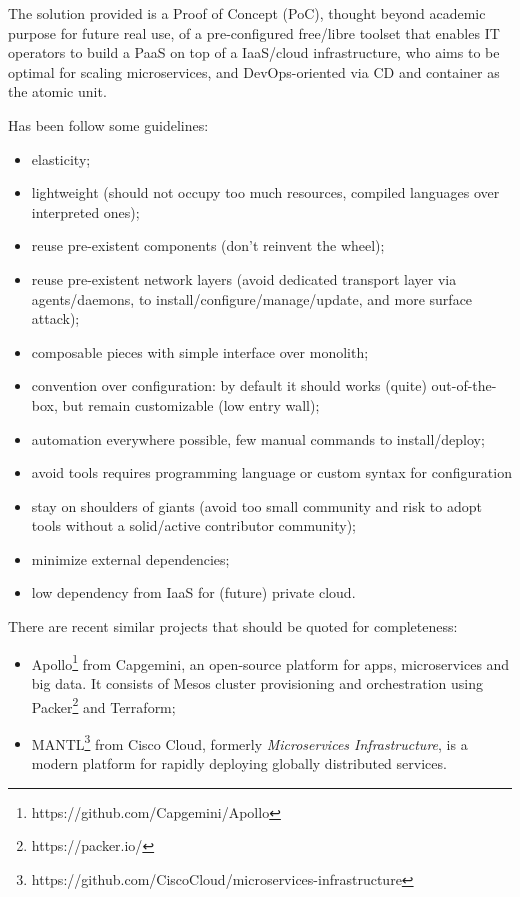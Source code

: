 The solution provided is a Proof of Concept (PoC), thought beyond academic purpose for future real use, of a pre-configured free/libre toolset that enables IT operators to build a PaaS on top of a IaaS/cloud infrastructure, who aims to be optimal for scaling microservices, and DevOps-oriented via CD and container as the atomic unit.

Has been follow some guidelines:

\begin{itemize}
\item elasticity;
\item lightweight (should not occupy too much resources, compiled languages
  over interpreted ones);
\item reuse pre-existent components (don't reinvent the wheel);
\item reuse pre-existent network layers (avoid dedicated transport layer via agents/daemons, to install/configure/manage/update, and more surface attack);
\item composable pieces with simple interface over monolith;
\item convention over configuration: by default it should works (quite)  out-of-the-box, but remain customizable (low entry wall);
\item automation everywhere possible, few manual commands to install/deploy;
\item avoid tools requires programming language or custom syntax for configuration
\item stay on shoulders of giants (avoid too small community and risk to adopt tools without a solid/active contributor community);
\item minimize external dependencies;
\item low dependency from IaaS for (future) private cloud.
\end{itemize}

There are recent similar projects that should be quoted for completeness:

\begin{itemize}
\item Apollo\footnote{https://github.com/Capgemini/Apollo} from Capgemini, an open-source platform for   apps, microservices and big data. It consists of Mesos cluster   provisioning and orchestration using Packer\footnote{https://packer.io/} and Terraform;
\item MANTL\footnote{https://github.com/CiscoCloud/microservices-infrastructure} from Cisco Cloud, formerly \textit{Microservices Infrastructure}, is a modern platform for rapidly   deploying globally distributed services.
\end{itemize}

